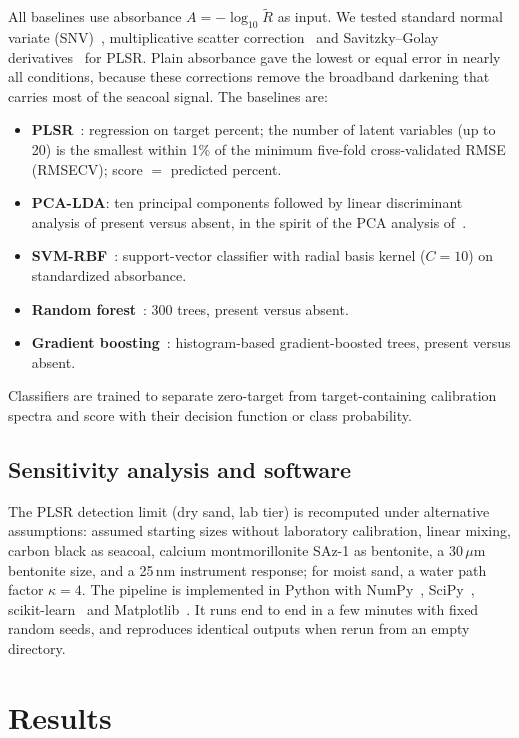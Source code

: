 \documentclass[10pt,twocolumn,letterpaper]{article}
\newcommand{\um}{\,$\mu$m}
\begin{document}
All baselines use absorbance $A=-\log_{10}\tilde R$ as input. We tested standard normal variate (SNV)~\cite{barnes1989}, multiplicative scatter correction~\cite{geladi1985} and Savitzky--Golay derivatives~\cite{savitzky1964,rinnan2009} for PLSR. Plain absorbance gave the lowest or equal error in nearly all conditions, because these corrections remove the broadband darkening that carries most of the seacoal signal. The baselines are:
\begin{itemize}\itemsep0pt
\item \textbf{PLSR}~\cite{wold2001}: regression on target percent; the number of latent variables (up to 20) is the smallest within 1\% of the minimum five-fold cross-validated RMSE (RMSECV); score $=$ predicted percent.
\item \textbf{PCA-LDA}: ten principal components followed by linear discriminant analysis of present versus absent, in the spirit of the PCA analysis of~\cite{kuubata2025}.
\item \textbf{SVM-RBF}~\cite{cortes1995}: support-vector classifier with radial basis kernel ($C=10$) on standardized absorbance.
\item \textbf{Random forest}~\cite{breiman2001}: 300 trees, present versus absent.
\item \textbf{Gradient boosting}~\cite{friedman2001}: histogram-based gradient-boosted trees, present versus absent.
\end{itemize}
Classifiers are trained to separate zero-target from target-containing calibration spectra and score with their decision function or class probability.

\subsection{Sensitivity analysis and software}

The PLSR detection limit (dry sand, lab tier) is recomputed under alternative assumptions: assumed starting sizes without laboratory calibration, linear mixing, carbon black as seacoal, calcium montmorillonite SAz-1 as bentonite, a 30\um{} bentonite size, and a 25\,nm instrument response; for moist sand, a water path factor $\kappa=4$. The pipeline is implemented in Python with NumPy~\cite{harris2020}, SciPy~\cite{virtanen2020}, scikit-learn~\cite{pedregosa2011} and Matplotlib~\cite{hunter2007}. It runs end to end in a few minutes with fixed random seeds, and reproduces identical outputs when rerun from an empty directory.

\section{Results}\label{sec:results}
\end{document}
